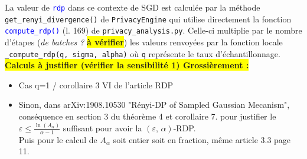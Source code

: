 \documentclass[a4paper,11pt]{article} %
\newcommand{\ttt}[1]{\texttt{#1}}
\newcommand{\file}[1]{\colorbox{blue!10}{\texttt{#1}}}
\newcommand{\code}[1]{\textcolor{blue}{\texttt{#1}}}
\newcommand{\rem}[1]{\colorbox{yellow}{\textbf{#1}}}
\begin{document}
La valeur de \code{rdp} dans ce contexte de SGD est calculée par la méthode \ttt{get\_renyi\_divergence()} de \ttt{PrivacyEngine} qui utilise directement la fonction \code{compute\_rdp()} (l. 169) de \file{privacy\_analysis.py}. Celle-ci multiplie par le nombre d'étapes (\emph{de batches ?} \rem{à vérifier}) les valeurs renvoyées par la fonction \og locale\fg{} \ttt{\_compute\_rdp(q, sigma, alpha)} où \ttt{q} représente le taux d'échantillonnage.
\\\rem{Calculs à justifier (vérifier la sensibilité 1) Grossièrement :}
\begin{itemize}
    \item
    Cas q=1 / corollaire 3 VI de l'article \og RDP\fg{}
    \item
    Sinon, dans arXiv:1908.10530 "Rényi-DP of Sampled Gaussian Mecanism", conséquence en section 3 du théorème 4 et corollaire 7. pour justifier le $\varepsilon \leqslant \frac{\ln (A_\alpha)}{\alpha - 1}$ suffisant pour avoir la $(\varepsilon,\,\alpha)$-RDP.\\
    Puis pour le calcul de $A_\alpha$ soit entier soit en fraction, même article 3.3 page 11.
\end{itemize}
\end{document}
